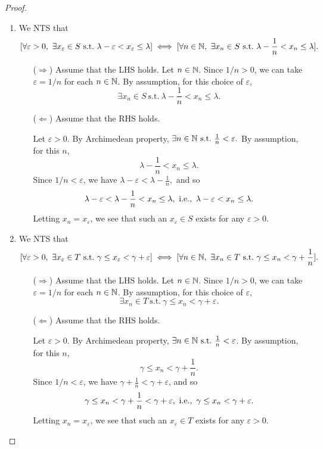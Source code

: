 \documentclass[11pt,openany]{article}
\begin{document}
\begin{proof}
\begin{enumerate}[(1)]
	\item We NTS that \[
	[\forall\varepsilon>0,\ \exists x_\varepsilon\in S\ \text{s.t.}\ \lambda-\varepsilon<x_\varepsilon\leq\lambda]
	\iff [\forall n\in\N,\ \exists x_n\in S\ \text{s.t.}\ \lambda-\frac{1}{n}<x_n\leq\lambda].
	\] \begin{itemize}
		\item[($\Rightarrow$)] Assume that the LHS holds. Let $n\in\mathbb{N}$. Since $1/n>0$, we can take $\varepsilon=1/n$ for each $n\in\mathbb{N}$. By assumption, for this choice of $\varepsilon$, \[
		\exists x_n\in S\ \text{s.t.}\ \lambda-\frac{1}{n}< x_n\leq\lambda.
		\]
		\item[($\Leftarrow$)] Assume that the RHS holds. 
		\begin{center}
		
		\end{center}
		Let $\varepsilon>0$. By Archimedean property, $\exists n\in\N\ \text{s.t.}\ \frac{1}{n}<\varepsilon.$ By assumption, for this $n$, \[
		\lambda-\frac{1}{n}< x_n\leq\lambda.
		\] Since $1/n<\varepsilon$, we have $\lambda-\varepsilon<\lambda-\frac{1}{n},$ and so \[
			\lambda-\varepsilon<\lambda-\frac{1}{n}<x_n\leq\lambda,\ \text{\ie},\ \lambda-\varepsilon< x_n\leq\lambda.
		\] Letting $x_n=x_\varepsilon$, we see that such an $x_\varepsilon\in S$ exists for any $\varepsilon>0$.
	\end{itemize}
	\item We NTS that \[
	[\forall\varepsilon>0,\ \exists x_\varepsilon\in T\ \text{s.t.}\ \gamma\leq x_\varepsilon<\gamma+\varepsilon]
	\iff[\forall n\in\mathbb{N},\ \exists x_n\in T\ \text{s.t.}\ \gamma\leq x_n<\gamma+\frac{1}{n}].
	\] \begin{itemize}
		\item[($\Rightarrow$)] Assume that the LHS holds. Let $n\in\mathbb{N}$. Since $1/n>0$, we can take $\varepsilon=1/n$ for each $n\in\mathbb{N}$. By assumption, for this choice of $\varepsilon$, \[
		\exists x_n\in T\ \text{s.t.}\ \gamma\leq x_n< \gamma+\varepsilon.
		\]
		\item[($\Leftarrow$)] Assume that the RHS holds. 
		\begin{center}
		
		\end{center}
		Let $\varepsilon>0$. By Archimedean property, $\exists n\in\N\ \text{s.t.}\ \frac{1}{n}<\varepsilon$. By assumption, for this $n$, \[
		\gamma\leq x_n<\gamma+\frac{1}{n}.
		\] Since $1/n<\varepsilon$, we have $\gamma+\frac{1}{n}<\gamma+\varepsilon$, and so \[
		\gamma\leq x_n<\gamma+\frac{1}{n}<\gamma+\varepsilon,\ \text{\ie},\ \gamma\leq x_n<\gamma+\varepsilon.
		\] Letting $x_n=x_\varepsilon$, we see that such an $x_\varepsilon\in T$ exists for any $\varepsilon>0$.
	\end{itemize}
\end{enumerate}
\end{proof}
\end{document}
